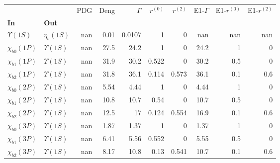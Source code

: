 \begin{tabular}{l|l|r|r|r|r|r|r|r|r}
\toprule
                &                &  PDG &  Deng &  $\Gamma$ &  $r^{(0)}$ &  $r^{(2)}$ &  E1-$\Gamma$ &  E1-$r^{(0)}$ &  E1-$r^{(2)}$ \\
\textbf{In} & \textbf{Out} &      &       &           &            &            &              &               &               \\
\midrule
\textbf{$\Upsilon(1S)$} & \textbf{$\eta_{b}(1S)$} &  nan &  0.01 &    0.0107 &          1 &          0 &          nan &           nan &           nan \\
\textbf{$\chi_{b0}(1P)$} & \textbf{$\Upsilon(1S)$} &  nan &  27.5 &      24.2 &          1 &          0 &         24.2 &             1 &             0 \\
\textbf{$\chi_{b1}(1P)$} & \textbf{$\Upsilon(1S)$} &  nan &  31.9 &      30.2 &      0.522 &          0 &         30.2 &           0.5 &             0 \\
\textbf{$\chi_{b2}(1P)$} & \textbf{$\Upsilon(1S)$} &  nan &  31.8 &      36.1 &      0.114 &      0.573 &         36.1 &           0.1 &           0.6 \\
\textbf{$\chi_{b0}(2P)$} & \textbf{$\Upsilon(1S)$} &  nan &  5.54 &      4.44 &          1 &          0 &         4.44 &             1 &             0 \\
\textbf{$\chi_{b1}(2P)$} & \textbf{$\Upsilon(1S)$} &  nan &  10.8 &      10.7 &       0.54 &          0 &         10.7 &           0.5 &             0 \\
\textbf{$\chi_{b2}(2P)$} & \textbf{$\Upsilon(1S)$} &  nan &  12.5 &        17 &      0.124 &      0.554 &         16.9 &           0.1 &           0.6 \\
\textbf{$\chi_{b0}(3P)$} & \textbf{$\Upsilon(1S)$} &  nan &  1.87 &      1.37 &          1 &          0 &         1.37 &             1 &             0 \\
\textbf{$\chi_{b1}(3P)$} & \textbf{$\Upsilon(1S)$} &  nan &  6.41 &      5.56 &      0.552 &          0 &         5.55 &           0.5 &             0 \\
\textbf{$\chi_{b2}(3P)$} & \textbf{$\Upsilon(1S)$} &  nan &  8.17 &      10.8 &       0.13 &      0.541 &         10.7 &           0.1 &           0.6 \\
\bottomrule
\end{tabular}
